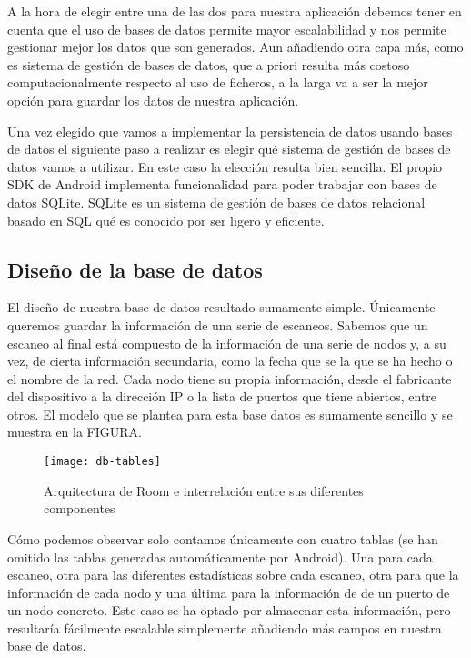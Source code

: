 A la hora de elegir entre una de las dos para nuestra aplicación debemos tener en cuenta que el uso de bases de datos permite mayor escalabilidad y nos permite gestionar mejor los datos que son generados. Aun añadiendo otra capa más, como es sistema de gestión de bases de datos, que a priori resulta más costoso computacionalmente respecto al uso de ficheros, a la larga va a ser la mejor opción para guardar los datos de nuestra aplicación.

Una vez elegido que vamos a implementar la persistencia de datos usando bases de datos el siguiente paso a realizar es  elegir qué sistema de gestión de bases de datos vamos a utilizar. En este caso la elección resulta bien sencilla. El propio SDK de Android implementa funcionalidad para poder trabajar con bases de datos SQLite. SQLite es un sistema de gestión de bases de datos relacional basado en SQL qué es conocido por ser ligero y eficiente.

\subsection{Diseño de la base de datos}

El diseño de nuestra base de datos resultado sumamente simple. Únicamente queremos guardar la información de una serie de escaneos. Sabemos que un escaneo al final está compuesto de la información de una serie de nodos y, a su vez, de cierta información secundaria, como la fecha que se la que se ha hecho o el nombre de la red. Cada nodo tiene su propia información, desde el fabricante del dispositivo a la dirección IP o la lista de puertos que tiene abiertos, entre otros. El modelo que se plantea para esta base datos es sumamente sencillo y se muestra en la FIGURA.

\begin{figure}[H]
	\centering
	\texttt{[image: db-tables]}
	\caption{Arquitectura de Room e interrelación entre sus diferentes componentes}
	\label{fig:db-tables}
\end{figure}

Cómo podemos observar solo contamos únicamente con cuatro tablas (se han omitido las tablas generadas automáticamente por Android). Una para cada escaneo, otra para las diferentes estadísticas sobre cada escaneo, otra para que la información de cada nodo y una última para la información de de un puerto de un nodo concreto. Este caso se ha optado por almacenar esta información, pero resultaría fácilmente escalable simplemente añadiendo más campos en nuestra base de datos.

